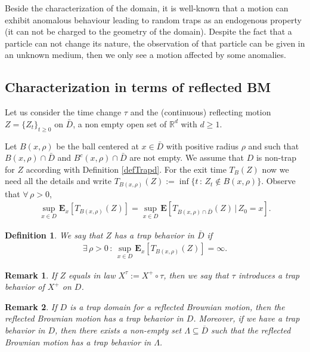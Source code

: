 \documentclass[[11pt,a4paper,reqno]{article}
\newtheorem{definition}{Definition}
\newtheorem{remark}{Remark}[section]
\numberwithin{equation}{section}
\begin{document}
Beside the characterization of the domain, it is well-known that a motion can exhibit anomalous behaviour leading to random traps as an endogenous property (it can not be charged to the geometry of the domain). Despite the fact that a particle can not change its nature, the observation of that particle can be given in an unknown medium, then we only see a motion affected by some anomalies.\\


\subsection{Characterization in terms of reflected BM}\label{RBM}

Let us consider the time change $\tau$ and the (continuous) reflecting motion $Z = \{Z_t \}_{t \geq 0}$ on $\bar{D}$, a non empty open set of $\mathbb{R}^d$ with $d\geq 1.$ 

Let $B(x,\rho)$ be the ball centered at $x \in \bar{D}$ with positive radius $\rho$ and such that $B(x,\rho) \cap \bar{D}$ and $B^c(x, \rho) \cap \bar{D}$ are not empty. We assume that $D$ is non-trap for $Z$ according with Definition \ref{defTrapd}. For the exit time $T_B(Z)$ now we need all the details and write $T_{B(x, \rho)} (Z) := \inf \{t\,:\, Z_t \notin B(x,\rho)\}$. Observe that $\forall\, \rho>0$,
\begin{align*}
\sup_{x \in D}  \mathbf{E}_x[T_{B(x,\rho)}(Z)] = \sup_{x \in D} \mathbf{E}[T_{B(x,\rho) \cap \bar{D}}(Z)\, |\, Z_0=x ].
\end{align*}

\begin{definition}
We say that $Z$ has a trap behavior in $\bar{D}$ if
\begin{align*}
\exists\, \rho >0\, :\, \sup_{x \in D}  \mathbf{E}_x[T_{B(x,\rho)}(Z)] = \infty.
\end{align*} 
\label{defTrapb}
\end{definition}

\begin{remark}
    If $Z$ equals in law $X^\tau:=X^+ \circ \tau$, then we say that $\tau$ introduces a trap behavior of $X^+$ on $D$.
\end{remark}

\begin{remark}
    If $D$ is a trap domain for a reflected Brownian motion, then the reflected Brownian motion has a trap behavior in $D$. Moreover, if we have a trap behavior in $D$, then there exists a non-empty set $\Lambda \subseteq \overline{D}$ such that the reflected Brownian motion has a trap behavior in $\Lambda$.  
\end{remark}
\end{document}
